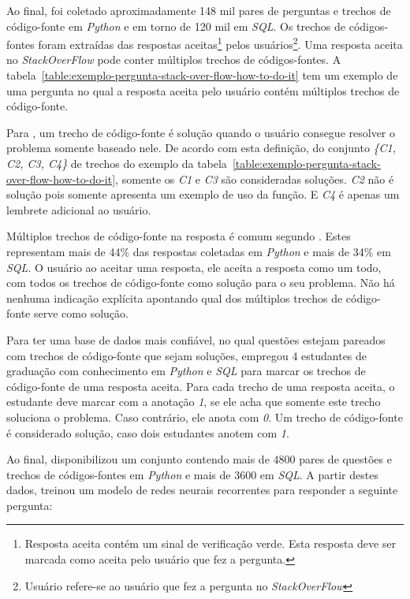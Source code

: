 Ao final, foi coletado aproximadamente 148 mil pares de perguntas e trechos de código-fonte em \emph{Python} e em torno de 120 mil em \emph{SQL}. Os trechos de códigos-fontes foram extraídas das respostas aceitas\footnote{Resposta aceita contém um sinal de verificação verde. Esta resposta deve ser marcada como aceita pelo usuário que fez a pergunta.} pelos usuários\footnote{Usuário refere-se ao usuário que fez a pergunta no \textit{StackOverFlow}}. Uma resposta aceita no \textit{StackOverFlow} pode conter múltiplos trechos de códigos-fontes. A tabela~\ref{table:exemplo-pergunta-stack-over-flow-how-to-do-it} tem um exemplo de uma pergunta no qual a resposta aceita pelo usuário contém múltiplos trechos de código-fonte.

Para \cite{yao-2018}, um trecho de código-fonte é solução quando o usuário consegue resolver o problema somente baseado nele.
De acordo com esta definição, do conjunto \emph{\{C1, C2, C3, C4\}} de trechos do exemplo da tabela~\ref{table:exemplo-pergunta-stack-over-flow-how-to-do-it}, somente os \emph{C1} e \emph{C3} são consideradas soluções. \emph{C2} não é solução pois somente apresenta um exemplo de uso da função. E \emph{C4} é apenas um lembrete adicional ao usuário.

Múltiplos trechos de código-fonte na resposta é comum segundo \cite{yao-2018}. Estes representam mais de 44\% das respostas coletadas em \textit{Python} e mais de 34\% em \textit{SQL}. O usuário ao aceitar uma resposta, ele aceita a resposta como um todo, com todos os trechos de código-fonte como solução para o seu problema. Não há nenhuma indicação explícita apontando qual dos múltiplos trechos de código-fonte serve como solução. 

Para ter uma base de dados mais confiável, no qual questões estejam pareados com trechos de código-fonte que sejam soluções, \cite{yao-2018} empregou 4 estudantes de graduação com conhecimento em \textit{Python} e \textit{SQL} para marcar os trechos de código-fonte de uma resposta aceita. Para cada trecho de uma resposta aceita, o estudante deve marcar com a anotação \emph{1}, se ele acha que somente este trecho soluciona o problema. Caso contrário, ele anota com \emph{0}. Um trecho de código-fonte é considerado solução, caso dois estudantes anotem com \emph{1}.

Ao final, \cite{yao-2018} disponibilizou um conjunto contendo mais de 4800 pares de questões e trechos de códigos-fontes em \textit{Python} e mais de 3600 em \textit{SQL}. A partir destes dados, \cite{yao-2018} treinou um modelo de redes neurais recorrentes para responder a seguinte pergunta:

